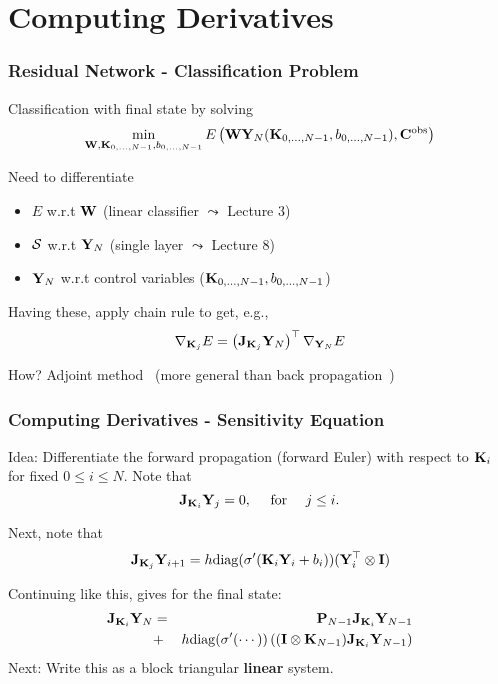 \documentclass[12pt,fleqn,handout]{beamer}
\begin{document}
\section{Computing Derivatives} %
\begin{frame}[fragile]\frametitle{Residual Network - Classification Problem}


Classification with final state by solving
$$ \min_{{\bf W}, {\bf K}_{0,\ldots,N-1},b_{0,\ldots,N-1}}E\left(
{\bf W} {\bf Y}_N({\bf K}_{0,\ldots,N-1},b_{0,\ldots,N-1}),{\bf C}^{\rm obs}\right) $$

\bigskip
\pause

Need to differentiate
\begin{itemize}
\item $E$ w.r.t ${\bf W}$ (linear classifier $\leadsto$ Lecture 3)

\item ${\cal S}$ w.r.t ${\bf Y}_N$ (single layer $\leadsto$ Lecture 8)

\item ${\bf Y}_N$ w.r.t control variables (${\bf K}_{0,\ldots,N-1},b_{0,\ldots,N-1}$)
\end{itemize}

\bigskip
\pause

Having these, apply chain rule to get, e.g.,
$$
\nabla_{{\bf K}_j} E =  \left({\bf J}_{{\bf K}_j} {{\bf Y}_N}\right)^{\top} \nabla_{{\bf Y}_N} E
$$

How? Adjoint method~\cite{bliss1919,BorzSchulz2012} (more general than back propagation~\cite{Rumelhart1986})
\end{frame}


\begin{frame}[fragile]\frametitle{Computing Derivatives - Sensitivity Equation}
Idea: Differentiate the forward propagation (forward Euler) with respect to ${\bf K}_i$ for fixed  $0\leq i \leq N$. Note that
$$
	{\bf J}_{{\bf K}_i} {\bf Y}_j = 0, \quad \text{ for } \quad j\leq i. 
$$

\smallskip
\pause

Next, note that 
$$
{\bf J}_{{\bf K}_j} {\bf Y}_{i+1} = h {\rm diag}(\sigma'( {\bf K}_i {\bf Y}_i + b_i))
(  {\bf Y}_i^\top \otimes {\bf I})
$$

\smallskip
\pause

Continuing like this, gives for the final state:
\begin{eqnarray*}
{\bf J}_{{\bf K}_i}{\bf Y}_{N} & =& {\bf P}_{N-1}  {\bf J}_{{\bf K}_i}{\bf Y}_{N-1}  \\
	&  +& h {\rm diag}(\sigma'( \cdots)) \left( ( {\bf I} \otimes {\bf K}_{N-1}) {\bf J}_{{\bf K}_i}{\bf Y}_{N-1}\right) 
\end{eqnarray*}
\smallskip
\pause
Next: Write this as a block triangular {\bf linear} system.
\end{frame}
\end{document}

